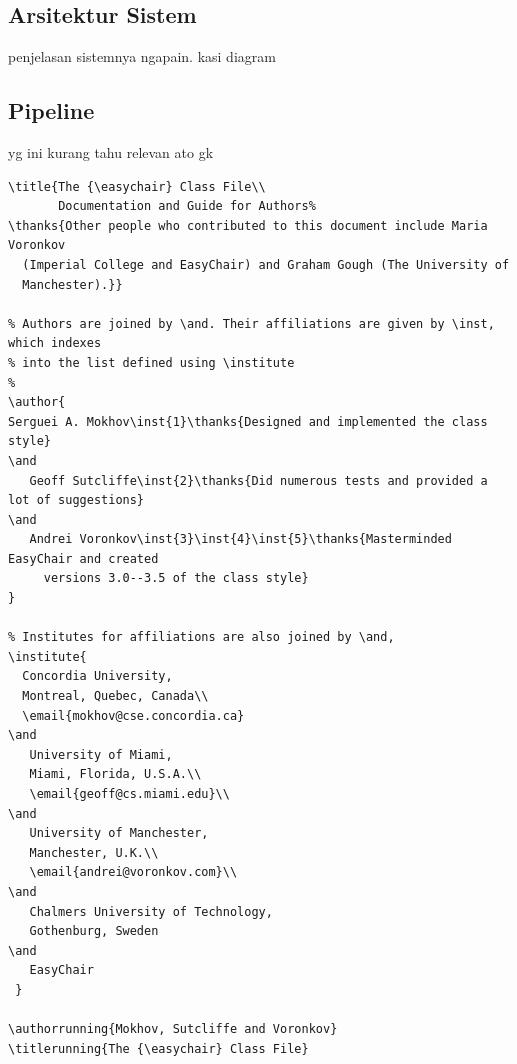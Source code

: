 \documentclass{easychair}
\newcommand{\easychair}{\textsf{easychair}}
\begin{document}
\subsection{Arsitektur Sistem}
\label{sect:arsitektur}

penjelasan sistemnya ngapain. kasi diagram

\subsection{Pipeline}
\label{sect:pipeline}

yg ini kurang tahu relevan ato gk


\noindent\small
\begin{verbatim}
\title{The {\easychair} Class File\\
       Documentation and Guide for Authors%
\thanks{Other people who contributed to this document include Maria Voronkov
  (Imperial College and EasyChair) and Graham Gough (The University of
  Manchester).}}

% Authors are joined by \and. Their affiliations are given by \inst, which indexes
% into the list defined using \institute
%
\author{
Serguei A. Mokhov\inst{1}\thanks{Designed and implemented the class style}
\and
   Geoff Sutcliffe\inst{2}\thanks{Did numerous tests and provided a lot of suggestions}
\and
   Andrei Voronkov\inst{3}\inst{4}\inst{5}\thanks{Masterminded EasyChair and created 
     versions 3.0--3.5 of the class style}
}

% Institutes for affiliations are also joined by \and,
\institute{
  Concordia University,
  Montreal, Quebec, Canada\\
  \email{mokhov@cse.concordia.ca}
\and
   University of Miami,
   Miami, Florida, U.S.A.\\
   \email{geoff@cs.miami.edu}\\
\and
   University of Manchester,
   Manchester, U.K.\\
   \email{andrei@voronkov.com}\\
\and
   Chalmers University of Technology,
   Gothenburg, Sweden
\and
   EasyChair
 }

\authorrunning{Mokhov, Sutcliffe and Voronkov}
\titlerunning{The {\easychair} Class File}
\end{verbatim}
\normalsize

\end{document}

